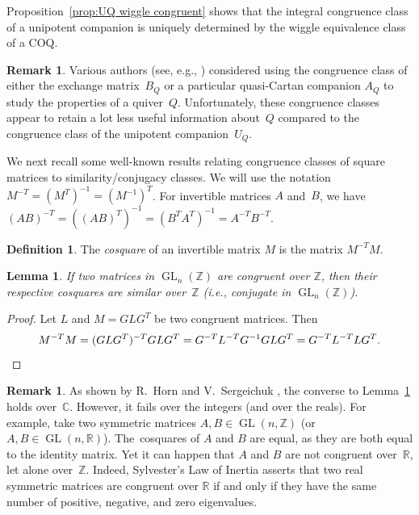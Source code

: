 \documentclass[11pt, letterpaper]{amsart}
\newtheorem{lemma}[theorem]{Lemma}
\theoremstyle{definition}
\newtheorem{remark}[theorem]{Remark}
\newtheorem{definition}[theorem]{Definition}
\numberwithin{equation}{section}
\def\ZZ{{\mathbb Z}}
\def\RR{{\mathbb R}}
\def\CC{{\mathbb C}}
\def\GL{{\operatorname{GL}}}
\begin{document}
Proposition~\ref{prop:UQ wiggle congruent} shows that the integral congruence class of a unipotent companion is uniquely determined by the wiggle equivalence class of a COQ. 


\begin{remark}
\label{rem:congruence-AB}
Various authors (see, e.g., \cite{BGZ,casals-binary, fwz1-3,Seven-congruence}) considered
using the congruence class of either the exchange matrix~$B_Q$ or 
a particular quasi-Cartan companion $A_Q$ to study the properties of a quiver~$Q$. 
Unfortunately, these congruence classes appear to retain a lot less useful information about~$Q$
compared to the congruence class of the unipotent companion~$U_Q$.  %
\end{remark}



We next recall some well-known results relating congruence classes of square matrices to similarity/conjugacy classes. 
%
We will use the notation $M^{-T}\!=\!(M^T)^{-1}\!=\!(M^{-1})^T$. 
For invertible matrices $A$ and~$B$,
we have 
$(AB)^{-T} \!=\! ((AB)^T)^{-1} \!=\! (B^T A^T)^{-1} \!=\!A^{-T} B^{-T}$. 

\begin{definition}
\label{def:cosquare}
The \emph{cosquare} of an invertible matrix $M$ is the matrix $M^{-T}M$. 
\end{definition}

\begin{lemma} 
\label{lem:C-sim=Ucong}
If two  matrices in $\operatorname{GL}_n(\ZZ)$ are congruent over $\ZZ$, 
then their respective cosquares are similar over~$\ZZ$ (i.e., conjugate in $\operatorname{GL}_n(\ZZ)$). 
 \end{lemma}

\begin{proof}
Let $L$ and $M=GLG^T$ be two congruent matrices. 
Then 
\[
 M^{-T} M =(GLG^T)^{-T}GLG^T=G^{-T}L^{-T}G^{-1}GLG^T=G^{-T}L^{-T}LG^T. \qedhere
 \]
\end{proof}

\begin{remark}
\label{rem:horn-sergeichuk}
As shown by R.~Horn and V.~Sergeichuk \cite[Lemma 2.1]{horn-sergeichuk}, 
the converse to Lemma~\ref{lem:C-sim=Ucong} holds over~$\CC$.
However, it fails over the integers (and over the reals). 
For example, take two symmetric matrices $A,B\in\GL(n,\ZZ)$ (or ${A, B\in\GL(n,\RR)}$).  
The~cosquares of $A$ and $B$ are equal, as they are both equal to the identity matrix. 
Yet it can happen that $A$ and $B$ are not congruent over~$\RR$, let alone over~$\ZZ$. 
Indeed, Sylvester's Law of Inertia asserts that  
two real symmetric matrices are congruent over $\RR$ 
if and only if they have the same number of positive, negative, and zero eigenvalues.
\end{remark}
\end{document}

